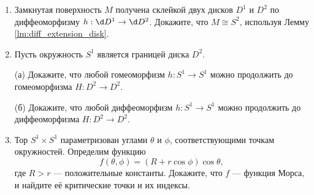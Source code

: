 \documentclass[a4paper,12pt,openany,leqno]{extbook}
\begin{document}
\begin{enumerate}
\item Замкнутая поверхность $M$ получена склейкой двух дисков $D^1$ и $D^2$ по диффеоморфизму $h: \d D^1 \to \d D^2$. Докажите, что $M \cong S^2$, используя Лемму \ref{lm:diff_extension_disk}.

\item Пусть окружность $S^1$ является границей диска $D^2$.

(а) Докажите, что любой гомеоморфизм $h: S^1 \to S^1$ можно продолжить до гомеоморфизма $H: D^2 \to D^2$.

(б) Докажите, что любой диффеоморфизм $h: S^1 \to S^1$ можно продолжить до диффеоморфизма $H: D^2 \to D^2$.

\item Тор $S^1 \times S^1$ параметризован углами $\theta$ и $\phi$, соответствующими точкам окружностей. Определим функцию
\[
f(\theta, \phi) = (R + r\cos \phi) \cos \theta,
\]
где $R > r$ --- положительные константы. Докажите, что $f$ --- функция Морса, и найдите её критические точки и их индексы.

\end{enumerate}
\end{document}
